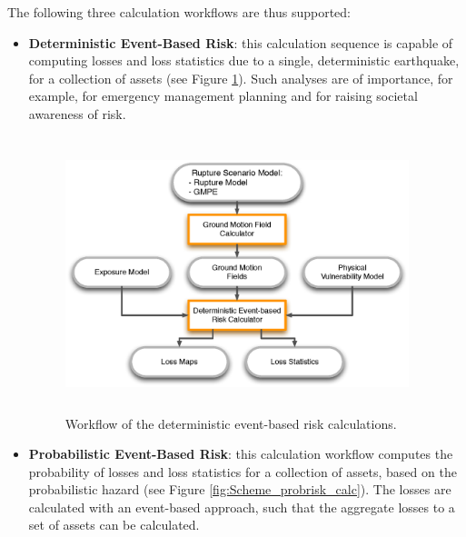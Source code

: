 The following three calculation workflows are thus supported:
\begin{itemize}
\item \textbf{Deterministic Event-Based Risk}: this calculation sequence is capable of computing losses and loss statistics due to a single,
deterministic earthquake, for a collection of assets (see Figure \ref{fig:Scheme_detrisk_calc}). Such analyses are of importance, for example, for emergency management planning and for raising societal awareness of risk. 

\begin{figure}[ht]
\centering
\includegraphics[width=10cm,height=8cm]{./Figures/Part_Risk/Scheme_Deter_calc.eps}
\caption{Workflow of the deterministic event-based risk calculations.}
\label{fig:Scheme_detrisk_calc}
\end{figure}

\item \textbf{Probabilistic Event-Based Risk}: this calculation workflow computes the probability of losses and loss statistics for a collection of
assets, based on the probabilistic hazard (see Figure \ref{fig:Scheme_probrisk_calc}). The losses are calculated with an event-based approach, such that the aggregate losses to a set of assets can be calculated.


\end{itemize}
